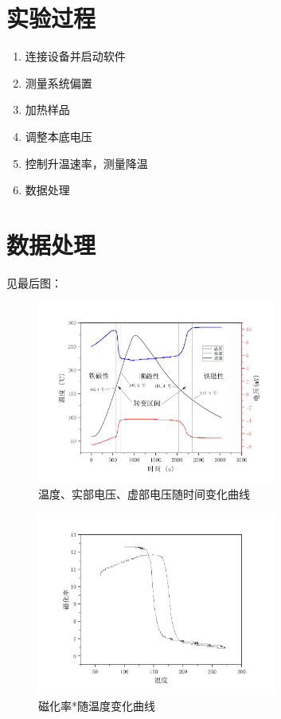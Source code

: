 \documentclass[a4paper,utf8]{article}
\begin{document}
\section{实验过程}
    \begin{enumerate}
        \item 连接设备并启动软件
        \item 测量系统偏置
        \item 加热样品
        \item 调整本底电压
        \item 控制升温速率，测量降温
        \item 数据处理
    \end{enumerate}
\section{数据处理}
    见最后图：\par
    \begin{figure}[!ht]
        \includegraphics[width=0.7\textwidth]{fig7.pdf}
        \caption{温度、实部电压、虚部电压随时间变化曲线}\label{fig:7}
    \end{figure}\par
    \begin{figure}[!ht]
        \includegraphics[width=0.7\textwidth]{fig8.pdf}
        \caption{磁化率*随温度变化曲线}\label{fig:8}
    \end{figure}\par
\end{document}
